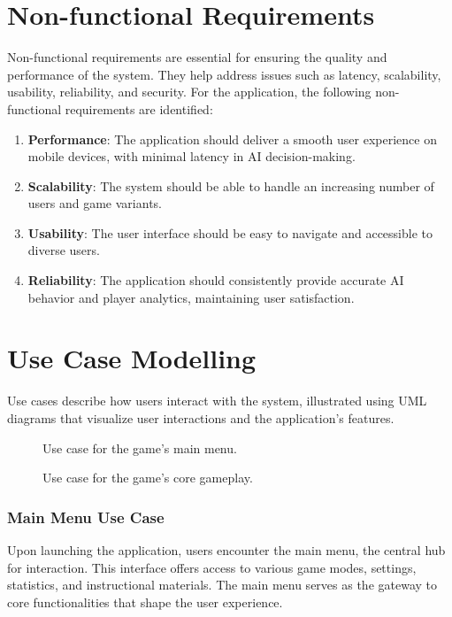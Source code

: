 \section{Non-functional Requirements}
Non-functional requirements are essential for ensuring the quality and performance of the system. They help address issues such as latency, scalability, usability, reliability, and security. For the application, the following non-functional requirements are identified:
\begin{enumerate}
\item {\bfseries Performance}: The application should deliver a smooth user experience on mobile devices, with minimal latency in AI decision-making.
\item {\bfseries Scalability}: The system should be able to handle an increasing number of users and game variants.
\item {\bfseries Usability}: The user interface should be easy to navigate and accessible to diverse users.
\item {\bfseries Reliability}: The application should consistently provide accurate AI behavior and player analytics, maintaining user satisfaction.
\end{enumerate}

\section{Use Case Modelling}
Use cases describe how users interact with the system, illustrated using UML diagrams that visualize user interactions and the application's features.

\begin{figure}[h]
    \centering
    
    \caption{Use case for the game's main menu.}
    \label{fig:main_menu_usecase}
\end{figure}

\begin{figure}[h]
    \centering
    
    \caption{Use case for the game's core gameplay.}
    \label{fig:game_usecase}
\end{figure}

\subsubsection{Main Menu Use Case}

Upon launching the application, users encounter the main menu, the central hub for interaction. This interface offers access to various game modes, settings, statistics, and instructional materials. The main menu serves as the gateway to core functionalities that shape the user experience.

